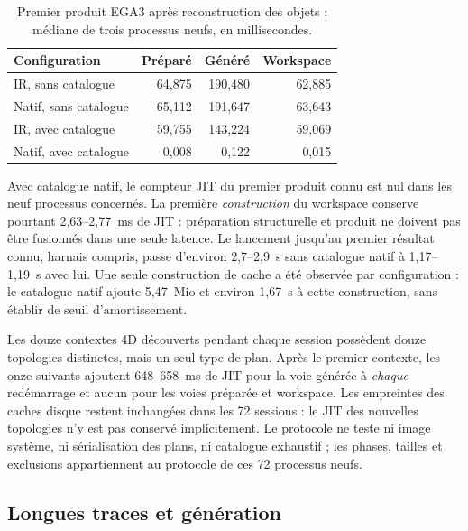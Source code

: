 \documentclass[11pt,a4paper]{article}
\begin{document}
\begin{table}[ht]
\centering\small
\begin{tabular}{@{}lrrr@{}}
\toprule
Configuration & Préparé & Généré & Workspace \\
\midrule
IR, sans catalogue & 64,875 & 190,480 & 62,885 \\
Natif, sans catalogue & 65,112 & 191,647 & 63,643 \\
IR, avec catalogue & 59,755 & 143,224 & 59,069 \\
Natif, avec catalogue & 0,008 & 0,122 & 0,015 \\
\bottomrule
\end{tabular}
\caption{Premier produit EGA3 après reconstruction des objets : médiane de
trois processus neufs, en millisecondes.}
\label{tab:precompile}
\end{table}

Avec catalogue natif, le compteur JIT du premier produit connu est nul dans
les neuf processus concernés. La première \emph{construction} du workspace
conserve pourtant 2,63--2,77~ms de JIT : préparation structurelle et produit
ne doivent pas être fusionnés dans une seule latence. Le lancement jusqu'au
premier résultat connu, harnais compris, passe d'environ 2,7--2,9~s sans
catalogue natif à 1,17--1,19~s avec lui. Une seule construction de cache a été
observée par configuration : le catalogue natif ajoute 5,47~Mio et environ
1,67~s à cette construction, sans établir de seuil d'amortissement.

Les douze contextes 4D découverts pendant chaque session possèdent douze
topologies distinctes, mais un seul type de plan. Après le premier contexte,
les onze suivants ajoutent 648--658~ms de JIT pour la voie générée à
\emph{chaque} redémarrage et aucun pour les voies préparée et workspace.
Les empreintes des caches disque restent inchangées dans les 72 sessions :
le JIT des nouvelles topologies n'y est pas conservé implicitement. Le
protocole ne teste ni image système, ni sérialisation des plans, ni catalogue
exhaustif ; les phases, tailles et exclusions appartiennent au protocole
de ces 72 processus neufs.
\FloatBarrier

\subsection{Longues traces et génération}
\end{document}
